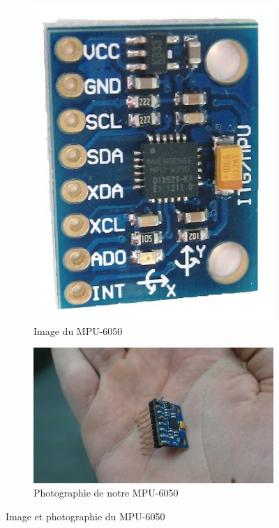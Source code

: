 \documentclass[a4paper,10pt]{report}
\begin{document}
	    \begin{figure}
	      \begin{subfigure}{.5\textwidth}
		\centering
		\includegraphics[scale=0.2]{img/mpu-6050.jpg}
		\caption{Image du MPU-6050}
		\label{imagempu6050}
	      \end{subfigure}%
	      \begin{subfigure}{.5\textwidth}
		\centering
		\includegraphics[scale=0.06]{img/mpu6050.jpg}
		\caption{Photographie de notre MPU-6050}
		\label{photompu6050}
	      \end{subfigure}
	      \caption{Image et photographie du MPU-6050}
	      \label{mpu6050}
	    \end{figure}
	    
\end{document}
